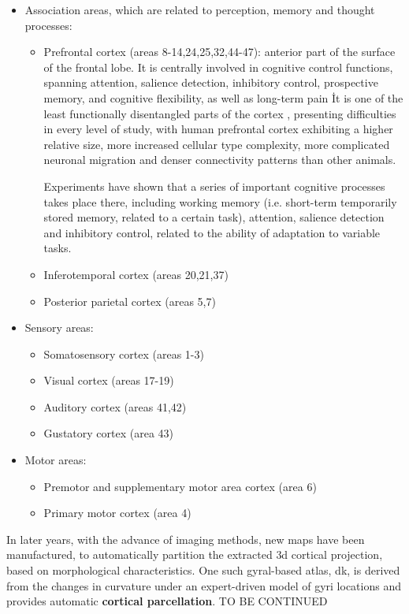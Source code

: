 \begin{itemize}
	\item{Association areas, which are related to perception, memory and thought processes:
		\begin{itemize}
			\item {Prefrontal cortex (areas 8-14,24,25,32,44-47): anterior part of the surface of the frontal lobe. It is centrally involved in cognitive control functions, spanning attention, salience detection, inhibitory control, prospective memory, and cognitive flexibility, as well as long-term pain \. It is one of the least functionally disentangled parts of the cortex \cite{Chini2021}, presenting difficulties in every level of study, with human prefrontal cortex exhibiting a higher relative size, more increased cellular type complexity, more complicated neuronal migration and denser connectivity patterns than other animals. 
				
				
				Experiments have shown that a series of important cognitive  processes takes place there, including working memory (i.e. short-term temporarily stored memory, related to a certain task), attention, salience detection and inhibitory control, related to the ability of adaptation to variable tasks. }
			\item {Inferotemporal cortex (areas 20,21,37)}
			\item {Posterior parietal cortex (areas 5,7)}
		\end{itemize}}
	\item{Sensory areas:
	\begin{itemize}
		\item {Somatosensory cortex (areas 1-3)}
		\item {Visual cortex (areas 17-19)}
		\item {Auditory cortex (areas 41,42)}
		\item {Gustatory cortex (area 43)}
	\end{itemize}}
	\item{Motor areas:
	\begin{itemize}
			\item {Premotor and supplementary motor area cortex (area 6)}
			\item {Primary motor cortex (area 4)}
	\end{itemize}}	
	
\end{itemize}




 In later years, with the advance of imaging methods, new maps have been manufactured, to automatically partition the extracted \ac{3d} cortical projection, based on morphological characteristics. One such gyral-based atlas, \ac{dk}, is derived from the changes in curvature under an expert-driven model of gyri locations \cite{Desikan2006} and provides automatic \textbf{cortical parcellation}. TO BE CONTINUED




